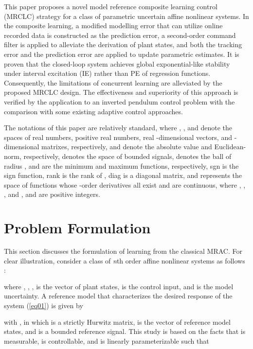 \documentclass[conference]{IEEEtran}
\begin{document}
This paper proposes a novel model reference composite learning control (MRCLC) strategy for a class of parametric uncertain affine nonlinear systems. In the composite learning, a modified modelling error that can utilize online recorded data is constructed as the prediction error, a second-order command filter is applied to alleviate the derivation of plant states, and both the tracking error and the prediction error are applied to update parametric estimates. It is proven that the closed-loop system achieves global exponential-like stability under interval excitation (IE) rather than PE of regression functions. Consequently, the limitations of concurrent learning are alleviated by the proposed MRCLC design. The effectiveness and superiority of this approach is verified by the application to an inverted pendulum control problem with the comparison with some existing adaptive control approaches.

The notations of this paper are relatively standard, where , ,  and  denote the spaces of real numbers, positive real numbers, real -dimensional vectors, and -dimensional matrixes, respectively,  and  denote the absolute value and Euclidean-norm, respectively,  denotes the space of bounded signals,  denotes the ball of radius ,  and  are the minimum and maximum functions, respectively, sgn is the sign function, rank is the rank of , diag is a diagonal matrix, and  represents the space of functions whose -order derivatives all exist and are continuous, where , , , and ,  and  are positive integers.

\section{Problem Formulation}

This section discusses the formulation of learning from the classical MRAC. For clear illustration, consider a class of \emph{n}th order affine nonlinear systems as follows \cite{Chowdhary2010a}:

where , , ,  is the vector of plant states,  is the control input, and  is the  model uncertainty. A reference model that characterizes the desired response of the system (\ref{eq01}) is given by

with , in which  is a strictly Hurwitz matrix,  is the vector of reference model states, and   is a bounded reference signal. This study is based on the facts that  is measurable,  is controllable, and  is linearly parameterizable such that \cite{Chowdhary2010a, Chowdhary2011, Chowdhary2014}
\end{document}
